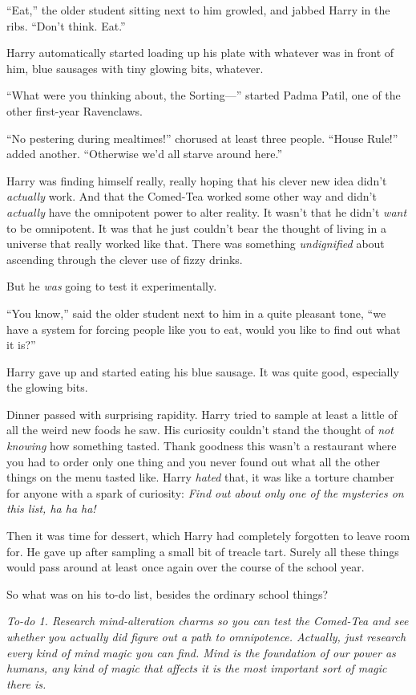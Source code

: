 “Eat,” the older student sitting next to him growled, and jabbed Harry in the ribs. “Don’t think. Eat.”

Harry automatically started loading up his plate with whatever was in front of him, blue sausages with tiny glowing bits, whatever.

“What were you thinking about, the Sorting—” started Padma Patil, one of the other first-year Ravenclaws.

“No pestering during mealtimes!” chorused at least three people. “House Rule!” added another. “Otherwise we’d all starve around here.”

Harry was finding himself really, really hoping that his clever new idea didn’t \emph{actually} work. And that the Comed-Tea worked some other way and didn’t \emph{actually} have the omnipotent power to alter reality. It wasn’t that he didn’t \emph{want} to be omnipotent. It was that he just couldn’t bear the thought of living in a universe that really worked like that. There was something \emph{undignified} about ascending through the clever use of fizzy drinks.

But he \emph{was} going to test it experimentally.

“You know,” said the older student next to him in a quite pleasant tone, “we have a system for forcing people like you to eat, would you like to find out what it is?”

Harry gave up and started eating his blue sausage. It was quite good, especially the glowing bits.

Dinner passed with surprising rapidity. Harry tried to sample at least a little of all the weird new foods he saw. His curiosity couldn’t stand the thought of \emph{not knowing} how something tasted. Thank goodness this wasn’t a restaurant where you had to order only one thing and you never found out what all the other things on the menu tasted like. Harry \emph{hated} that, it was like a torture chamber for anyone with a spark of curiosity: \emph{Find out about only one of the mysteries on this list, ha ha ha!}

Then it was time for dessert, which Harry had completely forgotten to leave room for. He gave up after sampling a small bit of treacle tart. Surely all these things would pass around at least once again over the course of the school year.

So what was on his to-do list, besides the ordinary school things?

\emph{To-do 1. Research mind-alteration charms so you can test the Comed-Tea and see whether you actually did figure out a path to omnipotence. Actually, just research every kind of mind magic you can find. Mind is the foundation of our power as humans, any kind of magic that affects it is the most important sort of magic there is.}

